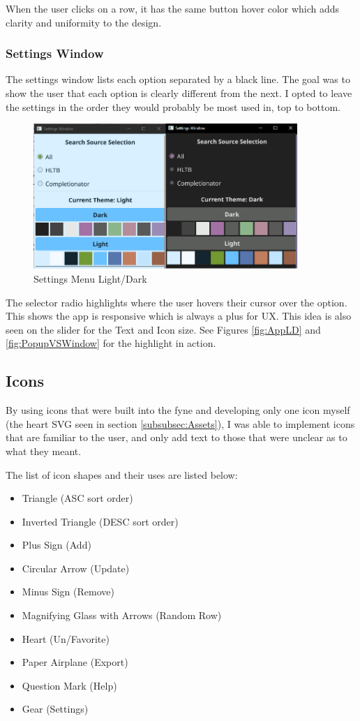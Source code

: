 When the user clicks on a row, it has the same button hover
color which adds clarity and uniformity to the design.

\subsubsection{Settings Window}

The settings window lists each option separated by a black line. The
goal was to show the user that each option is clearly different from
the next. I opted to leave the settings in the order they would
probably be most used in, top to bottom.

\begin{figure}[htb]
	\centering
	\includegraphics[width=10cm]{./Images/SettingsLD}
	\caption{Settings Menu Light/Dark}
	\label{fig:SettingsLD}
\end{figure}

The selector radio highlights where the user hovers their cursor over
the option. This shows the app is responsive which is always a plus for UX.
This idea is also seen on the slider for the Text and Icon size.
See Figures \ref{fig:AppLD} and \ref{fig:PopupVSWindow} for the
highlight in action.

\subsection{Icons}

By using icons that were built into the fyne and developing only one
icon myself (the heart SVG seen in section \ref{subsubsec:Assets}), I
was able to implement icons that are familiar to the user, and only
add text to those that were unclear as to what they meant.

The list of icon shapes and their uses are listed below:
\begin{itemize}
	\item Triangle (ASC sort order)
	\item Inverted Triangle (DESC sort order)
	\item Plus Sign (Add)
	\item Circular Arrow (Update)
	\item Minus Sign (Remove)
	\item Magnifying Glass with Arrows (Random Row)
	\item Heart (Un/Favorite)
	\item Paper Airplane (Export)
	\item Question Mark (Help)
	\item Gear (Settings)
\end{itemize}
